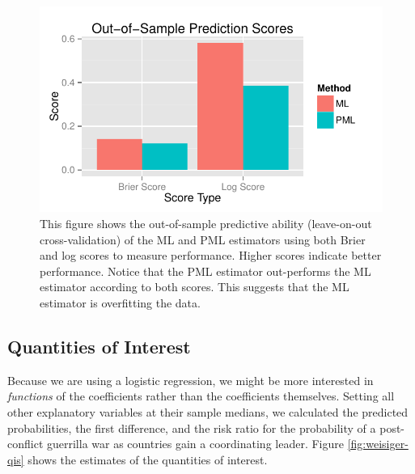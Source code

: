\documentclass[12pt]{article}
\begin{document}
\begin{figure}[H]
\begin{center}
\includegraphics[scale = 0.7]{figs/weisiger-out-sample-fit.pdf}
\caption{This figure shows the out-of-sample predictive ability (leave-on-out cross-validation) of the ML and PML estimators using both Brier and log scores to measure performance. Higher scores indicate better performance. Notice that the PML estimator out-performs the ML estimator according to both scores. This suggests that the ML estimator is overfitting the data.}\label{fig:weisiger-out-sample-fit}
\end{center}
\end{figure}

\subsection*{Quantities of Interest}

Because we are using a logistic regression, we might be more interested in \textit{functions} of the coefficients rather than the coefficients themselves. 
Setting all other explanatory variables at their sample medians, we calculated the predicted probabilities, the first difference, and the risk ratio for the probability of a post-conflict guerrilla war as countries gain a coordinating leader. 
Figure \ref{fig:weisiger-qis} shows the estimates of the quantities of interest.
\end{document}

